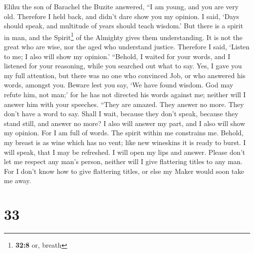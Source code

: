  Elihu the son of Barachel the Buzite answered, ``I am
young, and you are very old. Therefore I held back, and didn't dare show
you my opinion.  I said, `Days should speak, and multitude
of years should teach wisdom.'  But there is a spirit in
man, and the Spirit\footnote{\textbf{32:8} or, breath} of the Almighty
gives them understanding.  It is not the great who are
wise, nor the aged who understand justice.  Therefore I
said, `Listen to me; I also will show my opinion.' 
``Behold, I waited for your words, and I listened for your reasoning,
while you searched out what to say.  Yes, I gave you my
full attention, but there was no one who convinced Job, or who answered
his words, amongst you.  Beware lest you say, `We have
found wisdom. God may refute him, not man;'  for he has
not directed his words against me; neither will I answer him with your
speeches.  ``They are amazed. They answer no more. They
don't have a word to say.  Shall I wait, because they
don't speak, because they stand still, and answer no more?
 I also will answer my part, and I also will show my
opinion.  For I am full of words. The spirit within me
constrains me.  Behold, my breast is as wine which has no
vent; like new wineskins it is ready to burst.  I will
speak, that I may be refreshed. I will open my lips and answer.
 Please don't let me respect any man's person, neither
will I give flattering titles to any man.  For I don't
know how to give flattering titles, or else my Maker would soon take me
away.

\hypertarget{section-32}{%
\section{33}\label{section-32}}

